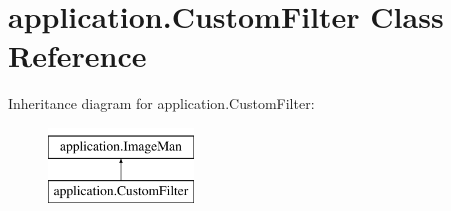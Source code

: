 \hypertarget{classapplication_1_1_custom_filter}{}\section{application.\+Custom\+Filter Class Reference}
\label{classapplication_1_1_custom_filter}
Inheritance diagram for application.\+Custom\+Filter\+:\begin{figure}[H]
\begin{center}
\leavevmode
\includegraphics[height=2.000000cm]{classapplication_1_1_custom_filter}
\end{center}
\end{figure}
